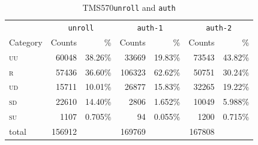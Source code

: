 \documentclass[10pt]{article}
\newcommand{\TI}{TMS570\xspace}
\newcommand{\unroll}{\texttt{unroll}\xspace}
\newcommand{\auth}{\texttt{auth}\xspace}
\newcommand{\authone}{\texttt{auth-1}\xspace}
\newcommand{\authtwo}{\texttt{auth-2}\xspace}
\newcommand{\UU}{\textsc{uu}\xspace}
\newcommand{\UD}{\textsc{ud}\xspace}
\newcommand{\SU}{\textsc{su}\xspace}
\newcommand{\SD}{\textsc{sd}\xspace}
\newcommand{\R}{\textsc{r}\xspace}
\begin{document}
      \begin{table}[H]
        \centering
        \begin{tabular}{l rr rr rr}
        \toprule

        & \multicolumn{2}{c}{\unroll}     &    
        \multicolumn{2}{c}{\authone}      &    
        \multicolumn{2}{c}{\authtwo}  \\
        \cmidrule(lr){2-3}                    
        \cmidrule(lr){4-5}
        \cmidrule(lr){6-7}
        \multicolumn{1}{c}{Category}  & 
        \multicolumn{1}{c}{Counts}      & \multicolumn{1}{r}{\%}          & 
        \multicolumn{1}{c}{Counts}      & \multicolumn{1}{r}{\%}          & 
        \multicolumn{1}{c}{Counts}      & \multicolumn{1}{r}{\%}          
        \\

        \midrule


        \UU    
        & 60048  & 38.26\%                   
        & 33669   & 19.83\%                     
        &  73543  & 43.82\%                 
        \\
        \R   
        & 57436  & 36.60\%                   
        & 106323  & 62.62\%                     
        &  50751  & 30.24\%                 
        \\
        \UD  
        & 15711  & 10.01\%                   
        & 26877   & 15.83\%                     
        &  32265  & 19.22\%                 
        \\
        \SD     
        & 22610  & 14.40\%                   
        & 2806    & 1.652\%                     
        &  10049  & 5.988\%                 
        \\
        \SU      
        & 1107   & 0.705\%                   
        & 94      & 0.055\%                     
        &  1200   & 0.715\%                 
        \\

        \cmidrule(l){1-7}
        total    
        & 156912 &                            
        & 169769  &                           
        &  167808 &                               
        \\       


        \bottomrule
        \end{tabular}
        \caption{\TI \unroll and \auth}
      \label{tab:tms570-unroll-auth-results}
      \end{table}
\end{document}
